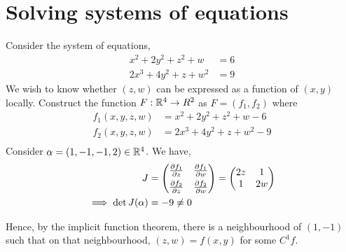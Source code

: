 \documentclass[../Analysis-3.tex]{subfiles}
\begin{document}
\section{Solving systems of equations}
\begin{Eg}{}{}
  Consider the system of equations,
  \begin{align*}
    x^2 + 2y^2 + z^2 + w  & = 6 \\
    2x^3 + 4y^2 + z + w^2 & = 9
  \end{align*}
  We wish to know whether \( (z,w) \) can be expressed as a function of \( (x,y) \) locally. Construct the function \( F: \mathbb{R}^4 \to R^2 \) as \( F = (f_1, f_2) \) where
  \begin{align*}
    f_1(x,y,z,w) & = x^2 + 2y^2 + z^2 + w - 6  \\
    f_2(x,y,z,w) & = 2x^3 + 4y^2 + z + w^2 - 9 \\
  \end{align*}
  Consider \( \alpha = (1,-1, -1, 2) \in \mathbb{R}^4 \). We have,
  \begin{align*}
    J                       & =
    \begin{pmatrix}
      \pdv{f_1}{z} & \pdv{f_1}{w} \\[4pt]
      \pdv{f_2}{z} & \pdv{f_2}{w}
    \end{pmatrix}
    =
    \begin{pmatrix}
      2z & 1  \\
      1  & 2w
    \end{pmatrix}                        \\
    \implies \det J(\alpha) & = -9 \neq 0
  \end{align*}

  Hence, by the implicit function theorem, there is a neighbourhood of \( (1,-1) \) such that on that neighbourhood, \( (z,w) = f(x,y) \) for some \( C^1 f \).

\end{Eg}
\end{document}
